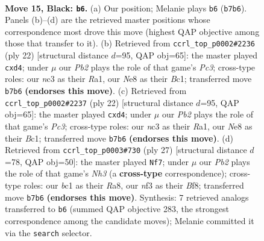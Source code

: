 \documentclass[11pt]{article}
\begin{document}
\clearpage

\begin{figure}[p]\centering
\begin{subfigure}{0.46\textwidth}\centering
\resizebox{\linewidth}{!}{%
\newchessgame
\chessboard[
  setfen={rn1rn1k1/ppp2pbp/P3b1p1/1PP1p3/4P2P/2N2N2/4BPP1/R1B1K2R b KQ - 0 15},
  showmover=false,
  pgfstyle=straightmove, color=movearrow, markmove={b7-b6}
]}
\caption{}
\end{subfigure}\hfill
\begin{subfigure}{0.46\textwidth}\centering
\resizebox{\linewidth}{!}{%
\newchessgame
\chessboard[
  setfen={r3kbnr/pp3pp1/n3p2p/3pP2P/3p4/2P5/PP1NNPP1/R1B1K2R w KQkq - 0 12},
  showmover=false,
  pgfstyle=straightmove, color=movearrow, markmove={c3-d4}
]}
\caption{}
\end{subfigure}
\\[4pt]
\begin{subfigure}{0.46\textwidth}\centering
\resizebox{\linewidth}{!}{%
\newchessgame
\chessboard[
  setfen={r3kbnr/pp3pp1/n3p2p/3pP2P/3p4/2P5/PP1NNPP1/R1B1K2R w KQkq - 0 12},
  showmover=false,
  pgfstyle=straightmove, color=movearrow, markmove={c3-d4}
]}
\caption{}
\end{subfigure}\hfill
\begin{subfigure}{0.46\textwidth}\centering
\resizebox{\linewidth}{!}{%
\newchessgame
\chessboard[
  setfen={r3kb1r/p2n2p1/1pp1bp1n/4p2p/P1N1P2P/2P1BPP1/1P6/RN2KB1R b kq - 0 14},
  showmover=false,
  pgfstyle=straightmove, color=movearrow, markmove={h6-f7}
]}
\caption{}
\end{subfigure}
\caption{\textbf{Move 15, Black: \texttt{b6}.} (a) Our position; Melanie plays \texttt{b6} (\texttt{b7b6}). Panels (b)--(d) are the retrieved master positions whose correspondence most drove this move (highest QAP objective among those that transfer to it). (b) Retrieved from \texttt{ccrl\_top\_p0002\#2236} (ply 22) [structural distance $d$=95, QAP obj=65]: the master played \texttt{cxd4}; under $\mu$ our \emph{Pb2} plays the role of that game's \emph{Pc3}; cross-type roles: our \emph{n}c3 as their \emph{R}a1, our \emph{N}e8 as their \emph{B}c1; transferred move \texttt{b7b6} \textbf{(endorses this move)}. (c) Retrieved from \texttt{ccrl\_top\_p0002\#2237} (ply 22) [structural distance $d$=95, QAP obj=65]: the master played \texttt{cxd4}; under $\mu$ our \emph{Pb2} plays the role of that game's \emph{Pc3}; cross-type roles: our \emph{n}c3 as their \emph{R}a1, our \emph{N}e8 as their \emph{B}c1; transferred move \texttt{b7b6} \textbf{(endorses this move)}. (d) Retrieved from \texttt{ccrl\_top\_p0003\#730} (ply 27) [structural distance $d$=78, QAP obj=50]: the master played \texttt{Nf7}; under $\mu$ our \emph{Pb2} plays the role of that game's \emph{Nh3} (a \textbf{cross-type} correspondence); cross-type roles: our \emph{b}c1 as their \emph{R}a8, our \emph{n}f3 as their \emph{B}f8; transferred move \texttt{b7b6} \textbf{(endorses this move)}. Synthesis: 7 retrieved analogs transferred to \texttt{b6} (summed QAP objective 283, the strongest correspondence among the candidate moves); Melanie committed it via the \texttt{search} selector.}
\label{fig:thought-m29}
\end{figure}
\end{document}
